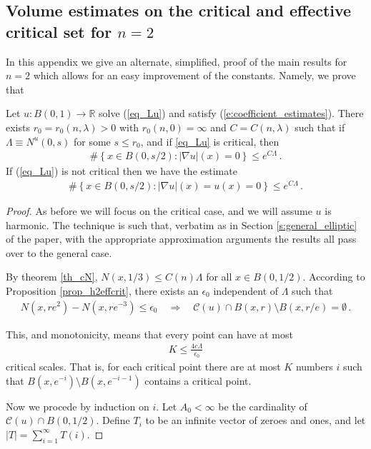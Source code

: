 \documentclass[11pt]{article}
\begin{document}
\begin{appendix}
\section[Volume estimates on the critical and effective critical set for n=2]{Volume estimates on the critical and effective critical set for $n=2$}

In this appendix we give an alternate, simplified, proof of the main results for $n=2$ which allows for an easy improvement of the constants.  Namely, we prove that 
\begin{theorem}
Let $u:B(0,1)\to{\mathds{R}}$ solve (\ref{eq_Lu}) and satisfy (\ref{e:coefficient_estimates}). There exists $r_0=r_0(n,\lambda)>0$ with $r_0(n,0)=\infty$ and $C=C(n,\lambda)$ such that if $\Lambda\equiv N^u(0,s)$ for some $s\leq r_0$, and if \eqref{eq_Lu} is critical, then 
 \begin{gather}
  \#{\left\{{x \in B(0,s/2): |\nabla u|(x)=0}\right\}} \leq e^{C \Lambda}\, .
 \end{gather}
 If (\ref{eq_Lu}) is not critical then we have the estimate 
  \begin{gather}
  \#{\left\{{x \in B(0,s/2):|\nabla u|(x)=u(x)=0}\right\}} \leq e^{C \Lambda}\, .
 \end{gather}
\end{theorem}
\begin{proof}
As before we will focus on the critical case, and we will assume $u$ is harmonic.  The technique is such that, verbatim as in Section \ref{s:general_elliptic} of the paper, with the appropriate approximation arguments the results all pass over to the general case.

By theorem \ref{th_cN}, $N(x,1/3)\leq C(n)\Lambda$ for all $x\in B(0,1/2)$. According to Proposition \ref{prop_h2effcrit}, there exists an $\epsilon_0$ independent of $\Lambda$ such that
\begin{gather}
 N(x,re^2)- N(x,re^{-3}) \leq \epsilon_0 \quad \Longrightarrow \quad {\mathcal{C}}(u) \cap B(x,r) \setminus B(x,r/e) = \emptyset\, .
\end{gather}

This, and monotonicity, means that every point can have at most
\begin{gather}
 K \leq \frac{4 c \Lambda}{\epsilon_0}
\end{gather}
critical scales. That is, for each critical point there are at most $K$ numbers $i$ such that $B(x,e^{-i})\setminus B(x,e^{-i-1})$ contains a critical point.

Now we procede by induction on $i$. Let $A_0<\infty$ be the cardinality of ${\mathcal{C}}(u)\cap B(0,1/2)$. Define $T_i$ to be an infinite vector of zeroes and ones, and let ${\left|T\right|} = \sum_{i=1}^\infty T(i)$.


\end{proof}
\end{appendix}
\end{document}
